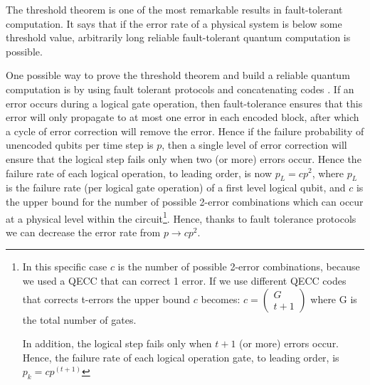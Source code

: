 The threshold theorem is one of the most remarkable results in fault-tolerant computation. It says that if the error rate of a physical system is below some threshold value, arbitrarily long reliable fault-tolerant quantum computation is possible.




One possible way to prove the threshold theorem and build a reliable quantum computation is by using fault tolerant protocols and concatenating codes \cite{Fault}.
If an error occurs during a logical gate operation, then fault-tolerance ensures that this error will only propagate to at most one error in each encoded block, after which a cycle of error correction will remove the error. Hence if the failure probability of unencoded qubits per time step is $p$, then a single level of error correction will ensure that the logical step fails only when two (or more) errors occur. Hence the failure rate of each logical operation, to leading order, is now $p_L = cp^2$, where $p_L$ is the failure rate (per logical gate operation) of a first level logical qubit, and $c$ is the upper bound for the number of possible 2-error combinations which can occur at a physical level within the circuit\footnote{In this specific case $c$ is the number of possible 2-error combinations, because we used a QECC that can correct 1 error. If we use different QECC codes that corrects t-errors the upper bound $c$ becomes: $c=\left(\begin{array}{c}
       G\\
       t+1
 \end{array}\right)$ where G is the total number of gates. 
 
 
 In addition, the logical step fails only when $t+1$ (or more) errors occur. Hence, the failure rate of each logical operation gate, to leading order, is $p_k = cp^{(t+1)}$
 
 
 }.
Hence, thanks to fault tolerance protocols we can decrease the error rate from $p \to cp^2$. 


